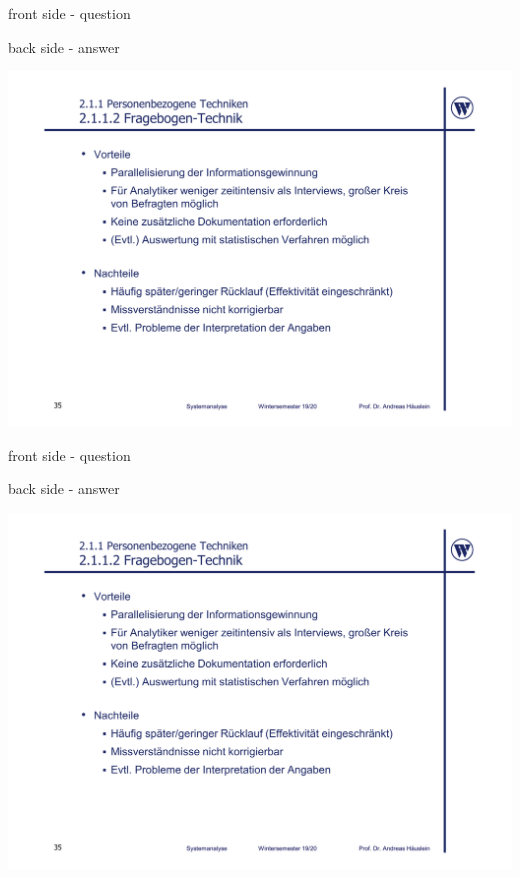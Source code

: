 \documentclass{article}
\begin{document}
\begin{tcolorbox}[colback=white!10!white,colframe=lightgray!75!black,
  savelowerto=\jobname_ex.tex]
	
	\begin{center}
  	front side - question
	\end{center}

  \tcblower

	
	\justifying
	back side - answer 

	\begin{center}
		\includegraphics[width=\linewidth]{test}
	\end{center}

\end{tcolorbox}

\begin{tcolorbox}[colback=white!10!white,colframe=lightgray!75!black,
  savelowerto=\jobname_ex.tex]
	
	\begin{center}
  	front side - question
	\end{center}

  \tcblower

	
	\justifying
	back side - answer 

	\begin{center}
		\includegraphics[width=\linewidth]{test}
	\end{center}

\end{tcolorbox}

\end{document}
